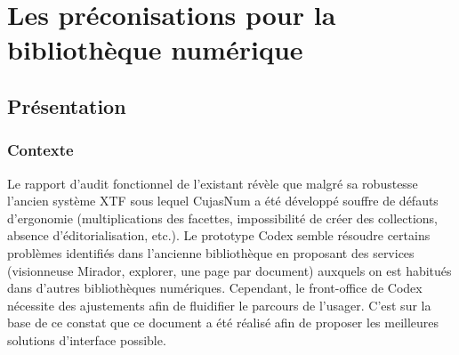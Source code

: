 \chapter{Les préconisations pour la bibliothèque numérique}


\section{Présentation}
\subsection{Contexte}
Le rapport d’audit fonctionnel de l’existant révèle que malgré sa robustesse l’ancien système XTF sous lequel CujasNum a été développé souffre de défauts d’ergonomie (multiplications des facettes, impossibilité de créer des collections, absence d’éditorialisation, etc.). Le prototype Codex semble résoudre certains problèmes identifiés dans l’ancienne bibliothèque en proposant des services (visionneuse Mirador, explorer, une page par document) auxquels on est habitués dans d’autres bibliothèques numériques. Cependant, le front-office de Codex nécessite des ajustements afin de fluidifier le parcours de l’usager. C’est sur la base de ce constat que ce document a été réalisé afin de proposer les meilleures solutions d’interface possible.

